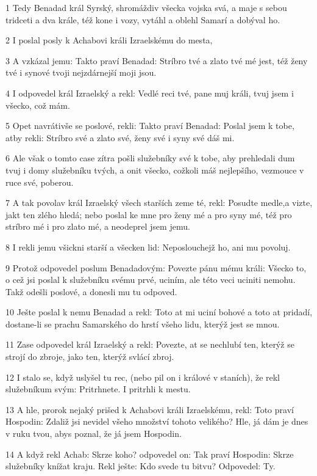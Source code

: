 \par 1 Tedy Benadad král Syrský, shromáždiv všecka vojska svá, a maje s sebou tridceti a dva krále, též kone i vozy, vytáhl a oblehl Samarí a dobýval ho.
\par 2 I poslal posly k Achabovi králi Izraelskému do mesta,
\par 3 A vzkázal jemu: Takto praví Benadad: Stríbro tvé a zlato tvé mé jest, též ženy tvé i synové tvoji nejzdárnejší moji jsou.
\par 4 I odpovedel král Izraelský a rekl: Vedlé reci tvé, pane muj králi, tvuj jsem i všecko, což mám.
\par 5 Opet navrátivše se poslové, rekli: Takto praví Benadad: Poslal jsem k tobe, atby rekli: Stríbro své a zlato své, ženy své i syny své dáš mi.
\par 6 Ale však o tomto case zítra pošli služebníky své k tobe, aby prehledali dum tvuj i domy služebníku tvých, a onit všecko, cožkoli máš nejlepšího, vezmouce v ruce své, poberou.
\par 7 A tak povolav král Izraelský všech starších zeme té, rekl: Posudte medle,a vizte, jakt ten zlého hledá; nebo poslal ke mne pro ženy mé a pro syny mé, též pro stríbro mé i pro zlato mé, a neodeprel jsem jemu.
\par 8 I rekli jemu všickni starší a všecken lid: Neposlouchejž ho, ani mu povoluj.
\par 9 Protož odpovedel poslum Benadadovým: Povezte pánu mému králi: Všecko to, o cež jsi poslal k služebníku svému prvé, uciním, ale této veci uciniti nemohu. Takž odešli poslové, a donesli mu tu odpoved.
\par 10 Ješte poslal k nemu Benadad a rekl: Toto at mi uciní bohové a toto at pridadí, dostane-li se prachu Samarského do hrstí všeho lidu, kterýž jest se mnou.
\par 11 Zase odpovedel král Izraelský a rekl: Povezte, at se nechlubí ten, kterýž se strojí do zbroje, jako ten, kterýž svlácí zbroj.
\par 12 I stalo se, když uslyšel tu rec, (nebo pil on i králové v staních), že rekl služebníkum svým: Pritrhnete. I pritrhli k mestu.
\par 13 A hle, prorok nejaký prišed k Achabovi králi Izraelskému, rekl: Toto praví Hospodin: Zdaliž jsi nevidel všeho množství tohoto velikého? Hle, já dám je dnes v ruku tvou, abys poznal, že já jsem Hospodin.
\par 14 A když rekl Achab: Skrze koho? odpovedel on: Tak praví Hospodin: Skrze služebníky knížat kraju. Rekl ješte: Kdo svede tu bitvu? Odpovedel: Ty.
